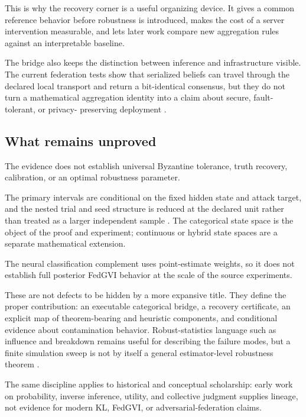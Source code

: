 \documentclass[
  english,
]{article}
\theoremstyle{plain}
\theoremstyle{definition}
\theoremstyle{remark}
\theoremstyle{definition}
\begin{document}
This is why the recovery corner is a useful organizing device. It gives
a common reference behavior before robustness is introduced, makes the
cost of a server intervention measurable, and lets later work compare
new aggregation rules against an interpretable baseline.

The bridge also keeps the distinction between inference and
infrastructure visible. The current federation tests show that
serialized beliefs can travel through the declared local transport and
return a bit-identical consensus, but they do not turn a mathematical
aggregation identity into a claim about secure, fault-tolerant, or
privacy- preserving deployment
\citep{mcmahan2017communication, blanchard2017krum, pillutla2022robust}.

\subsection{What remains unproved}\label{sec:conclusion-boundaries}

The evidence does not establish universal Byzantine tolerance, truth
recovery, calibration, or an optimal robustness parameter.

The primary intervals are conditional on the fixed hidden state and
attack target, and the nested trial and seed structure is reduced at the
declared unit rather than treated as a larger independent sample
\citep{koehler2009mcse, loy2021lmeresampler}. The categorical state
space is the object of the proof and experiment; continuous or hybrid
state spaces are a separate mathematical extension.

The neural classification complement uses point-estimate weights, so it
does not establish full posterior FedGVI behavior at the scale of the
source experiments.

These are not defects to be hidden by a more expansive title. They
define the proper contribution: an executable categorical bridge, a
recovery certificate, an explicit map of theorem-bearing and heuristic
components, and conditional evidence about contamination behavior.
Robust-statistics language such as influence and breakdown remains
useful for describing the failure modes, but a finite simulation sweep
is not by itself a general estimator-level robustness theorem
\citep{huber2009robust}.

The same discipline applies to historical and conceptual scholarship:
early work on probability, inverse inference, utility, and collective
judgment supplies lineage, not evidence for modern KL, FedGVI, or
adversarial-federation claims.
\end{document}
